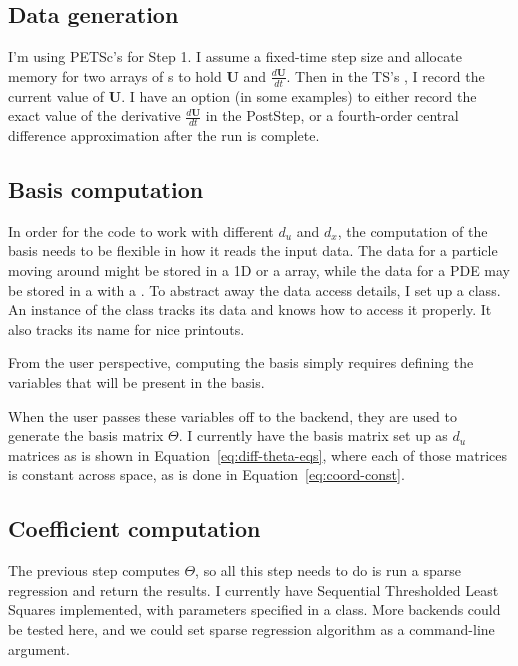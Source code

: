 \documentclass{article}
\let\vec\mathbf
\def\lstinline#1{}%
\begin{document}
\subsection{Data generation}

I'm using PETSc's \lstinline{TS} for Step 1. I assume a fixed-time step size and
allocate memory for two arrays of \lstinline{Vec}s to hold $\vec{U}$ and
$\frac{d\vec{U}}{dt}$. Then in the TS's \lstinline{PostStep}, I record the
current value of $\vec{U}$. I have an option (in some examples) to either record
the exact value of the derivative $\frac{d\vec{U}}{dt}$ in the PostStep, or a
fourth-order central difference approximation after the run is complete.


\subsection{Basis computation}

In order for the code to work with different $d_u$ and $d_x$, the computation of
the basis needs to be flexible in how it reads the input data. The data
for a particle moving around might be stored in a 1D \lstinline{Vec} or a
\lstinline{PetscScalar} array, while the data for a PDE may be stored in a
\lstinline{Vec} with a \lstinline{DMDA}. To abstract away the data access
details, I set up a \lstinline{Variable} class. An instance of the class tracks
its data and knows how to access it properly. It also tracks its name for nice
printouts.

From the user perspective, computing the basis simply requires defining the variables
that will be present in the basis.

When the user passes these variables off to the backend, they are used to
generate the basis matrix $\Theta$.
I currently have the basis matrix set up as $d_u$ matrices as is shown in Equation~\ref{eq:diff-theta-eqs}, where
each of those matrices is constant across space, as is done in Equation~\ref{eq:coord-const}.


\subsection{Coefficient computation}

The previous step computes $\Theta$, so all this step needs to do is run a
sparse regression and return the results. I currently have Sequential
Thresholded Least Squares implemented, with parameters specified in a
\lstinline{SparseReg} class. More backends could be tested here, and we could
set sparse regression algorithm as a command-line argument.
\end{document}

